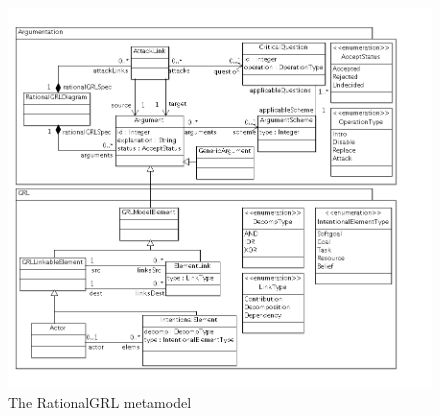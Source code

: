 \begin{figure}[h!]
\includegraphics[width=\textwidth]{metamodel/metamodel}
\caption{The RationalGRL metamodel}
\label{fig:metamodel}
\end{figure}